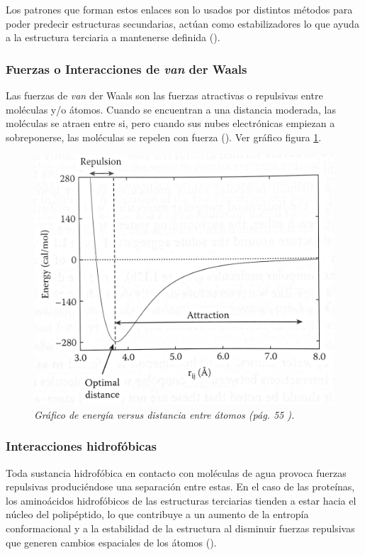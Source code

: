 Los patrones que forman estos enlaces  son lo usados por distintos métodos para poder predecir estructuras secundarias, actúan como estabilizadores lo que ayuda a la estructura terciaria a mantenerse definida (\citealp{hbond}).

\subsubsection{Fuerzas o Interacciones de \textit{van} der Waals}
Las fuerzas de \textit{van} der Waals son las fuerzas atractivas o repulsivas entre moléculas y/o átomos. Cuando se encuentran a una distancia moderada, las moléculas se atraen entre si, pero cuando sus nubes electrónicas empiezan a sobreponerse, las moléculas se repelen con fuerza (\citealp{entropia}). Ver gráfico figura \ref{fig:graph-vanderwaals}.
\begin{figure}[h]
	\centering
	\includegraphics[scale=1]{images/vanderwaals.png}
	\caption{\em Gráfico de energía versus distancia entre átomos (pág. 55 \citealp{book:kessel}).}
	\label{fig:graph-vanderwaals}
\end{figure}

\subsubsection{Interacciones hidrofóbicas}

Toda sustancia hidrofóbica en contacto con moléculas de agua provoca fuerzas repulsivas produciéndose una separación entre estas. En el caso de las proteínas, los aminoácidos hidrofóbicos de las estructuras terciarias tienden a estar hacia el núcleo del polipéptido, lo que contribuye a un aumento de la entropía conformacional y a la estabilidad de la estructura al disminuir fuerzas repulsivas que generen cambios espaciales de los átomos  (\citealp{molecular:book}).


